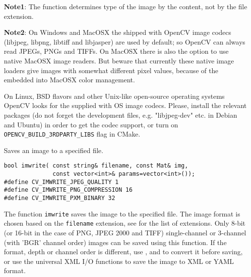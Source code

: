 \textbf{Note1}: The function determines type of the image by the content, not by the file extension.

\textbf{Note2}: On Windows and MacOSX the shipped with OpenCV image codecs (libjpeg, libpng, libtiff and libjasper) are used by default; so OpenCV can always read JPEGs, PNGs and TIFFs. On MacOSX there is also the option to use native MacOSX image readers. But beware that currently these native image loaders give images with somewhat different pixel values, because of the embedded into MacOSX color management.

On Linux, BSD flavors and other Unix-like open-source operating systems OpenCV looks for the supplied with OS image codecs. Please, install the relevant packages (do not forget the development files, e.g. "libjpeg-dev" etc. in Debian and Ubuntu) in order to get the codec support, or turn on \texttt{OPENCV\_BUILD\_3RDPARTY\_LIBS} flag in CMake. 

Saves an image to a specified file.

\begin{lstlisting}
bool imwrite( const string& filename, const Mat& img,
              const vector<int>& params=vector<int>());
#define CV_IMWRITE_JPEG_QUALITY 1
#define CV_IMWRITE_PNG_COMPRESSION 16
#define CV_IMWRITE_PXM_BINARY 32
\end{lstlisting}
\begin{description}
\end{description}

The function \texttt{imwrite} saves the image to the specified file. The image format is chosen based on the \texttt{filename} extension, see  for the list of extensions. Only 8-bit (or 16-bit in the case of PNG, JPEG 2000 and TIFF) single-channel or 3-channel (with 'BGR' channel order) images can be saved using this function. If the format, depth or channel order is different, use , and  to convert it before saving, or use the universal XML I/O functions to save the image to XML or YAML format.


